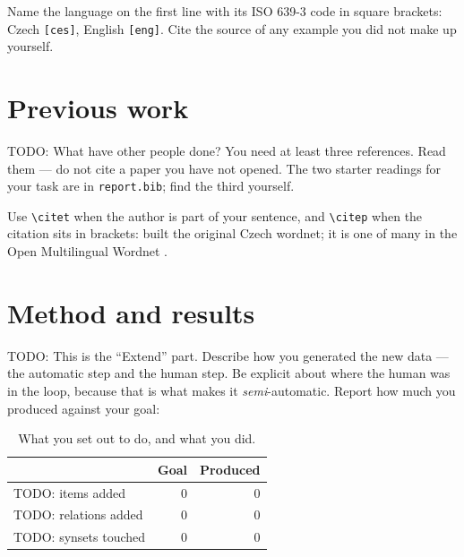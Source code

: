 \documentclass[a4paper,12pt]{article}
\begin{document}
Name the language on the first line with its ISO 639-3 code in square
brackets: Czech \texttt{[ces]}, English \texttt{[eng]}.  Cite the
source of any example you did not make up yourself.

\section{Previous work}

TODO: What have other people done?  You need at least three references.
Read them --- do not cite a paper you have not opened.  The two starter
readings for your task are in \texttt{report.bib}; find the third
yourself.

Use \verb|\citet| when the author is part of your sentence, and
\verb|\citep| when the citation sits in brackets:
\citet{palasmrz2004} built the original Czech wordnet; it is one of
many in the Open Multilingual Wordnet \citep{bond-foster2013}.

\section{Method and results}

TODO: This is the ``Extend'' part.  Describe how you generated the new
data --- the automatic step and the human step.  Be explicit about
where the human was in the loop, because that is what makes it
\emph{semi}-automatic.  Report how much you produced against your goal:

\begin{table}[ht]
  \centering
  \begin{tabular}{lrr}
    \toprule
    & Goal & Produced \\
    \midrule
    TODO: items added          & 0 & 0 \\
    TODO: relations added      & 0 & 0 \\
    TODO: synsets touched      & 0 & 0 \\
    \bottomrule
  \end{tabular}
  \caption{What you set out to do, and what you did.}
  \label{tab:results}
\end{table}

\end{document}

